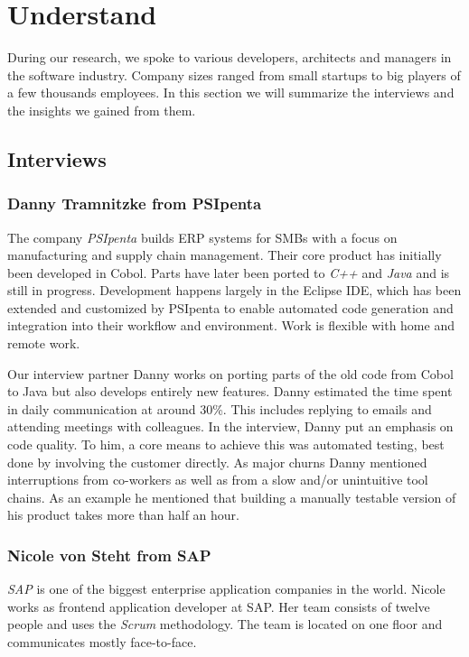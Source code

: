 \section[Understand (Author: Johan Uhle)]{Understand} 
\label{sec:UNDERSTAND}
During our research, we spoke to various developers, architects and managers in the software industry. Company sizes ranged from small startups to big players of a few thousands employees. In this section we will summarize the interviews and the insights we gained from them.

\subsection{Interviews}
\subsubsection{Danny Tramnitzke from PSIpenta}
The company \emph{PSIpenta} builds ERP systems for SMBs with a focus on manufacturing and supply chain management. Their core product has initially been developed in Cobol. Parts have later been ported to \emph{C++} and \emph{Java} and is still in progress. Development happens largely in the Eclipse IDE, which has been extended and customized by PSIpenta to enable automated code generation and integration into their workflow and environment. Work is flexible with home and remote work.

Our interview partner Danny works on porting parts of the old code from Cobol to Java but also develops entirely new features.
Danny estimated the time spent in daily communication at around 30\%. This includes replying to emails and attending meetings with colleagues.
In the interview, Danny put an emphasis on code quality. To him, a core means to achieve this was automated testing, best done by involving the customer directly.
As major churns Danny mentioned interruptions from co-workers as well as from a slow and/or unintuitive tool chains. As an example he mentioned that building a manually testable version of his product takes more than half an hour.

\subsubsection{Nicole von Steht from SAP}
\emph{SAP} is one of the biggest enterprise application companies in the world. Nicole works as frontend application developer at SAP. Her team consists of twelve people and uses the \emph{Scrum} methodology. The team is located on one floor and communicates mostly face-to-face.

